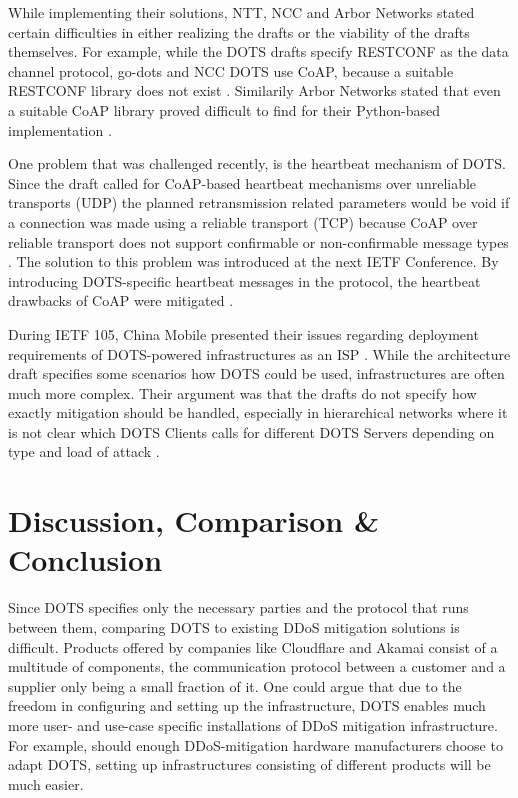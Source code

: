 While implementing their solutions, NTT, NCC and Arbor Networks stated certain difficulties in either realizing the drafts or the viability of the drafts themselves. For example, while the DOTS drafts specify RESTCONF as the data channel protocol, go-dots and NCC DOTS use CoAP, because a suitable RESTCONF library does not exist \cite{hackathon-99}. Similarily Arbor Networks stated that even a suitable CoAP library proved difficult to find for their Python-based implementation \cite{arbor-101}.

One problem that was challenged recently, is the heartbeat mechanism of DOTS. Since the draft called for CoAP-based heartbeat mechanisms over unreliable transports (UDP) the planned retransmission related parameters would be void if a connection was made using a reliable transport (TCP) because CoAP over reliable transport does not support confirmable or non-confirmable message types \cite{heartbeat-challenge}. The solution to this problem was introduced at the next IETF Conference. By introducing DOTS-specific heartbeat messages in the protocol, the heartbeat drawbacks of CoAP were mitigated \cite{heartbeat-solution}.

During IETF 105, China Mobile presented their issues regarding deployment requirements of DOTS-powered infrastructures as an ISP \cite{china-mobile-105}. While the architecture draft specifies some scenarios how DOTS could be used, infrastructures are often much more complex. Their argument was that the drafts do not specify how exactly mitigation should be handled, especially in hierarchical networks where it is not clear which DOTS Clients calls for different DOTS Servers depending on type and load of attack \cite{chen-deployment}.


\section{Discussion, Comparison \& Conclusion}


Since DOTS specifies only the necessary parties and the protocol that runs between them, comparing DOTS to existing DDoS mitigation solutions is difficult. Products offered by companies like Cloudflare and Akamai consist of a multitude of components, the communication protocol between a customer and a supplier only being a small fraction of it. One could argue that due to the freedom in configuring and setting up the infrastructure, DOTS enables much more user- and use-case specific installations of DDoS mitigation infrastructure. For example, should enough DDoS-mitigation hardware manufacturers choose to adapt DOTS, setting up infrastructures consisting of different products will be much easier.


